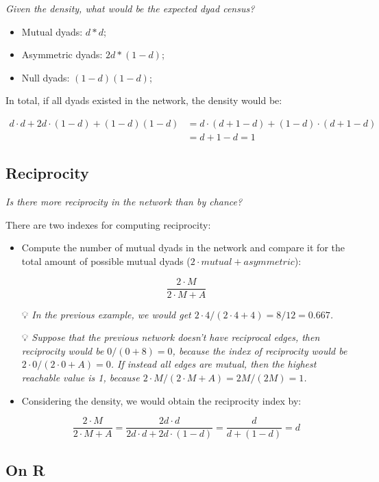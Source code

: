 \documentclass[
  notitlepage,
  onecolumn,
  openany]{book}
\providecommand{\tightlist}{%
  \setlength{\itemsep}{0pt}\setlength{\parskip}{0pt}}
\begin{document}
\emph{Given the density, what would be the expected dyad census?}

\begin{itemize}
\tightlist
\item
  Mutual dyads: \(d*d\);
\item
  Asymmetric dyads: \(2d*(1-d)\);
\item
  Null dyads: \((1-d)(1-d)\);
\end{itemize}

In total, if all dyads existed in the network, the density would be:

\[
\begin{aligned}
d \cdot d+2d\cdot (1-d)+(1-d)(1-d)&= d\cdot(d+1-d)+(1-d)\cdot(d+1-d) \\
&= d+1-d = 1
\end{aligned}
\]

\hypertarget{reciprocity}{%
\subsection{Reciprocity}\label{reciprocity}}

\emph{Is there more reciprocity in the network than by chance?}

There are two indexes for computing reciprocity:

\begin{itemize}
\item
  Compute the number of mutual dyads in the network and compare it for the total amount of possible mutual dyads (\(2 \cdot mutual + asymmetric\)):

  \[
    \frac{2\cdot M}{2\cdot M+A}
    \]

  💡 \emph{In the previous example, we would get \(2\cdot4/(2\cdot4+4) = 8/12 = 0.667\).}

  💡 \emph{Suppose that the previous network doesn't have reciprocal edges, then reciprocity would be \(0/(0+8) = 0\), because the index of reciprocity would be \(2\cdot 0/(2\cdot 0+A) = 0\).
  If instead all edges are mutual, then the highest reachable value is 1, because \(2\cdot M/(2\cdot M+A) = 2M/(2M) = 1\).}
\item
  Considering the density, we would obtain the reciprocity index by:

  \[
    \frac{2\cdot M}{2\cdot M+A} = \frac{2d\cdot d}{2 d\cdot d+2d\cdot(1-d)} = \frac{d}{d+(1-d)} = d
    \]
\end{itemize}

\hypertarget{on-r}{%
\subsection{On R}\label{on-r}}
\end{document}
